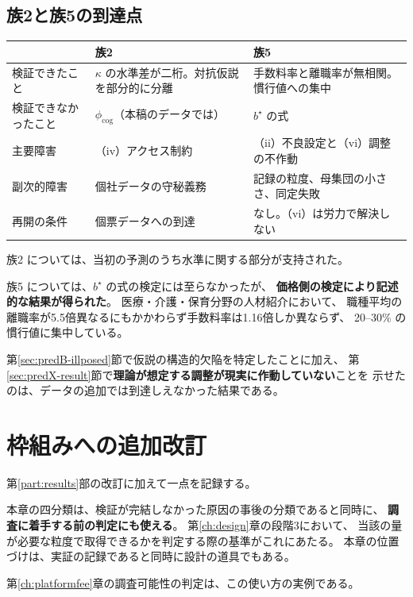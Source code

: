 \subsection{族2と族5の到達点}

\begin{center}
\begin{tabularx}{\textwidth}{@{}lXX@{}}
\toprule
 & 族2 & 族5 \\
\midrule
検証できたこと & $\kappa$ の水準差が二桁。対抗仮説を部分的に分離
 & 手数料率と離職率が無相関。慣行値への集中 \\
検証できなかったこと & $\phi_{\mathrm{cog}}$（本稿のデータでは） & $b^\star$ の式 \\
主要障害 & （iv）アクセス制約 & （ii）不良設定と（vi）調整の不作動 \\
副次的障害 & 個社データの守秘義務 & 記録の粒度、母集団の小ささ、同定失敗 \\
再開の条件 & 個票データへの到達 & なし。（vi）は労力で解決しない \\
\bottomrule
\end{tabularx}
\label{tab:family2-5-summary}
\end{center}

族2 については、当初の予測のうち水準に関する部分が支持された。

族5 については、$b^\star$ の式の検定には至らなかったが、
\textbf{価格側の検定により記述的な結果が得られた}。
医療・介護・保育分野の人材紹介において、
職種平均の離職率が5.5倍異なるにもかかわらず手数料率は1.16倍しか異ならず、
20--30\% の慣行値に集中している。

第\ref{sec:predB-illposed}節で仮説の構造的欠陥を特定したことに加え、
第\ref{sec:predX-result}節で\textbf{理論が想定する調整が現実に作動していない}ことを
示せたのは、データの追加では到達しえなかった結果である。

\section{枠組みへの追加改訂}

第\ref{part:results}部の改訂に加えて一点を記録する。

本章の四分類は、検証が完結しなかった原因の事後の分類であると同時に、
\textbf{調査に着手する前の判定にも使える}。
第\ref{ch:design}章の段階3において、
当該の量が必要な粒度で取得できるかを判定する際の基準がこれにあたる。
本章の位置づけは、実証の記録であると同時に設計の道具でもある。

第\ref{ch:platformfee}章の調査可能性の判定は、この使い方の実例である。
